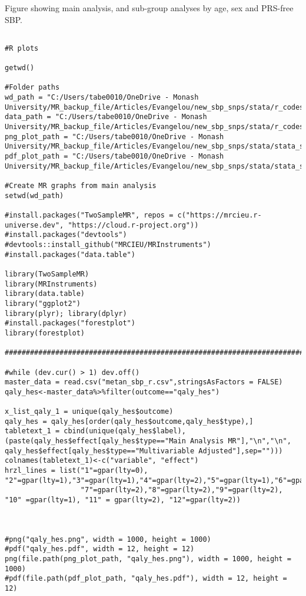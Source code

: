 \documentclass[11pt]{article}
\begin{document}
Figure showing main analysis, and sub-group analyses by age, sex and PRS-free SBP. 
\begin{lstlisting}[style=Rstyle]

#R plots 

getwd()

#Folder paths
wd_path = "C:/Users/tabe0010/OneDrive - Monash University/MR_backup_file/Articles/Evangelou/new_sbp_snps/stata/r_codes/r_data"
data_path = "C:/Users/tabe0010/OneDrive - Monash University/MR_backup_file/Articles/Evangelou/new_sbp_snps/stata/r_codes/r_data"
png_plot_path = "C:/Users/tabe0010/OneDrive - Monash University/MR_backup_file/Articles/Evangelou/new_sbp_snps/stata/stata_sbp_plot/png"
pdf_plot_path = "C:/Users/tabe0010/OneDrive - Monash University/MR_backup_file/Articles/Evangelou/new_sbp_snps/stata/stata_sbp_plot/pdf"

#Create MR graphs from main analysis
setwd(wd_path)

#install.packages("TwoSampleMR", repos = c("https://mrcieu.r-universe.dev", "https://cloud.r-project.org"))
#install.packages("devtools")
#devtools::install_github("MRCIEU/MRInstruments")
#install.packages("data.table")

library(TwoSampleMR)
library(MRInstruments)
library(data.table)
library("ggplot2")
library(plyr); library(dplyr)
#install.packages("forestplot")
library(forestplot)

#######################################################################

#while (dev.cur() > 1) dev.off()
master_data = read.csv("metan_sbp_r.csv",stringsAsFactors = FALSE)
qaly_hes<-master_data%>%filter(outcome=="qaly_hes")

x_list_qaly_1 = unique(qaly_hes$outcome)
qaly_hes = qaly_hes[order(qaly_hes$outcome,qaly_hes$type),]
tabletext_1 = cbind(unique(qaly_hes$label),(paste(qaly_hes$effect[qaly_hes$type=="Main Analysis MR"],"\n","\n", qaly_hes$effect[qaly_hes$type=="Multivariable Adjusted"],sep="")))
colnames(tabletext_1)<-c("variable", "effect")
hrzl_lines = list("1"=gpar(lty=0), "2"=gpar(lty=1),"3"=gpar(lty=1),"4"=gpar(lty=2),"5"=gpar(lty=1),"6"=gpar(lty=2),
                  "7"=gpar(lty=2),"8"=gpar(lty=2),"9"=gpar(lty=2), "10" =gpar(lty=1), "11" = gpar(lty=2), "12"=gpar(lty=2))



#png("qaly_hes.png", width = 1000, height = 1000)
#pdf("qaly_hes.pdf", width = 12, height = 12)
png(file.path(png_plot_path, "qaly_hes.png"), width = 1000, height = 1000)
#pdf(file.path(pdf_plot_path, "qaly_hes.pdf"), width = 12, height = 12)


\end{lstlisting}
\end{document}

